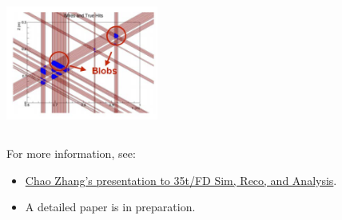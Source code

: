 \documentclass[xcolor=dvipsnames]{beamer}
\begin{document}
\begin{frame}
\begin{columns}
\begin{column}{0.4\paperwidth}
\begin{center}
      \includegraphics[width=5cm]{blobs.png}
      \end{center}
    \end{column}
  \end{columns}

  \vspace{5mm}
  \footnotesize
  For more information, see:
  \begin{itemize}
  \item \href{https://indico.fnal.gov/getFile.py/access?contribId=3&resId=0&materialId=slides&confId=10240}{Chao
      Zhang's presentation to 35t/FD Sim, Reco, and Analysis}.
    
  \item A detailed paper is in preparation.
  \end{itemize}
\end{frame}
\end{document}
